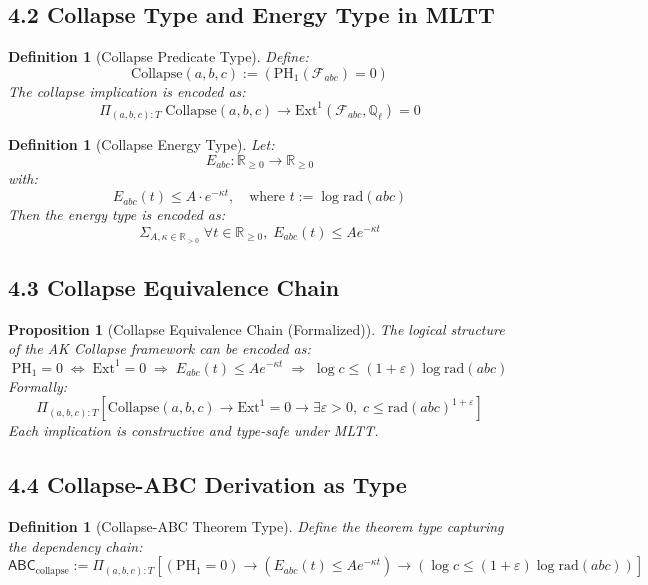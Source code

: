 \documentclass[11pt]{article}
\newtheorem{definition}[theorem]{Definition}
\newtheorem{proposition}[theorem]{Proposition}
\begin{document}
\subsection{4.2 Collapse Type and Energy Type in MLTT}

\begin{definition}[Collapse Predicate Type]
Define:
\[
\mathrm{Collapse}(a,b,c) := \left( \mathrm{PH}_1(\mathcal{F}_{abc}) = 0 \right)
\]
The collapse implication is encoded as:
\[
\Pi_{(a,b,c):T} \; \mathrm{Collapse}(a,b,c) \to \mathrm{Ext}^1(\mathcal{F}_{abc}, \mathbb{Q}_\ell) = 0
\]
\end{definition}

\begin{definition}[Collapse Energy Type]
Let:
\[
E_{abc} : \mathbb{R}_{\geq 0} \to \mathbb{R}_{\geq 0}
\]
with:
\[
E_{abc}(t) \leq A \cdot e^{-\kappa t},\quad \text{where } t := \log \mathrm{rad}(abc)
\]
Then the energy type is encoded as:
\[
\Sigma_{A, \kappa \in \mathbb{R}_{>0}} \; \forall t \in \mathbb{R}_{\geq 0},\; E_{abc}(t) \leq A e^{-\kappa t}
\]
\end{definition}

\subsection{4.3 Collapse Equivalence Chain}

\begin{proposition}[Collapse Equivalence Chain (Formalized)]
The logical structure of the AK Collapse framework can be encoded as:
\[
\mathrm{PH}_1 = 0 \;\Leftrightarrow\; \mathrm{Ext}^1 = 0 \;\Rightarrow\; E_{abc}(t) \leq A e^{-\kappa t} \;\Rightarrow\; \log c \leq (1+\varepsilon) \log \mathrm{rad}(abc)
\]
Formally:
\[
\Pi_{(a,b,c):T} \left[ \mathrm{Collapse}(a,b,c) \to \mathrm{Ext}^1 = 0 \to \exists \varepsilon > 0,\; c \leq \mathrm{rad}(abc)^{1+\varepsilon} \right]
\]
Each implication is constructive and type-safe under MLTT.
\end{proposition}

\subsection{4.4 Collapse-ABC Derivation as Type}

\begin{definition}[Collapse-ABC Theorem Type]
Define the theorem type capturing the dependency chain:
\[
\mathsf{ABC}_{\text{collapse}} := \Pi_{(a,b,c):T} \left[ 
\left( \mathrm{PH}_1 = 0 \right) \to 
\left( E_{abc}(t) \leq A e^{-\kappa t} \right) \to 
\left( \log c \leq (1+\varepsilon) \log \mathrm{rad}(abc) \right)
\right]
\]
\end{definition}
\end{document}
